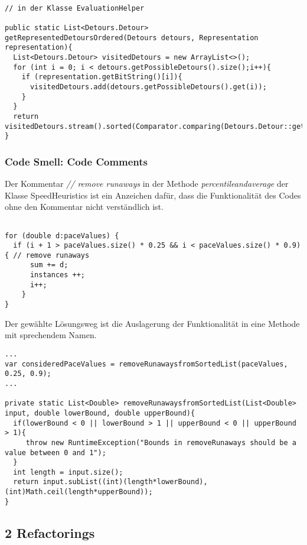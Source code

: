 \begin{lstlisting}

// in der Klasse EvaluationHelper 

public static List<Detours.Detour> getRepresentedDetoursOrdered(Detours detours, Representation representation){
  List<Detours.Detour> visitedDetours = new ArrayList<>();
  for (int i = 0; i < detours.getPossibleDetours().size();i++){
    if (representation.getBitString()[i]){
      visitedDetours.add(detours.getPossibleDetours().get(i));
    }
  }
  return visitedDetours.stream().sorted(Comparator.comparing(Detours.Detour::getPosition)).toList();
}

\end{lstlisting}


\subsubsection{Code Smell: Code Comments}

Der Kommentar \textit{// remove runaways} in der Methode \textit{percentileandaverage} der Klasse SpeedHeuristics ist ein Anzeichen dafür, dass die Funktionalität des Codes ohne den Kommentar nicht verständlich ist.

\begin{lstlisting}

for (double d:paceValues) {
  if (i + 1 > paceValues.size() * 0.25 && i < paceValues.size() * 0.9){ // remove runaways
      sum += d;
      instances ++;
      i++;
    }
}
\end{lstlisting}

Der gewählte Lösungsweg ist die Auslagerung der Funktionalität in eine Methode mit sprechendem Namen. 

\begin{lstlisting}
...
var consideredPaceValues = removeRunawaysfromSortedList(paceValues, 0.25, 0.9);
...

private static List<Double> removeRunawaysfromSortedList(List<Double> input, double lowerBound, double upperBound){
  if(lowerBound < 0 || lowerBound > 1 || upperBound < 0 || upperBound > 1){
     throw new RuntimeException("Bounds in removeRunaways should be a value between 0 and 1");
  }
  int length = input.size();
  return input.subList((int)(length*lowerBound),(int)Math.ceil(length*upperBound));
}

\end{lstlisting}

\subsection{2 Refactorings}

